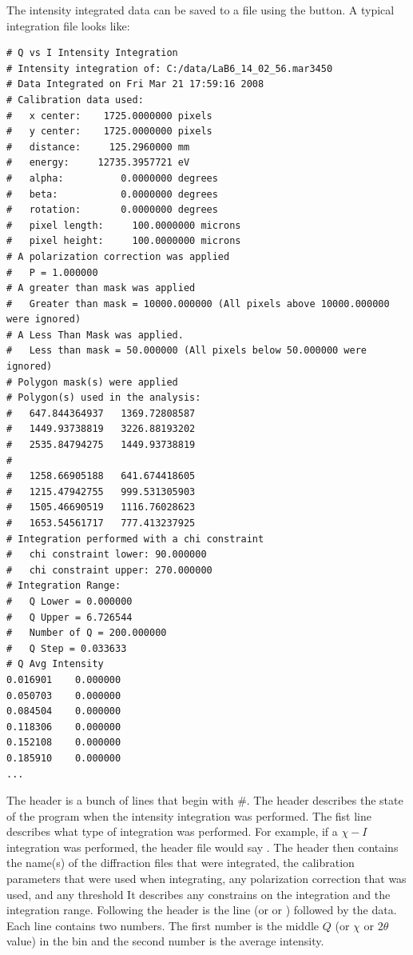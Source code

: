 The intensity integrated data can be saved to a file
using the  button. 
A typical integration file looks like:
\begin{lstlisting}
# Q vs I Intensity Integration
# Intensity integration of: C:/data/LaB6_14_02_56.mar3450 
# Data Integrated on Fri Mar 21 17:59:16 2008
# Calibration data used:
#   x center:    1725.0000000 pixels
#   y center:    1725.0000000 pixels
#   distance:     125.2960000 mm
#   energy:     12735.3957721 eV
#   alpha:          0.0000000 degrees
#   beta:           0.0000000 degrees
#   rotation:       0.0000000 degrees
#   pixel length:     100.0000000 microns
#   pixel height:     100.0000000 microns
# A polarization correction was applied
#   P = 1.000000
# A greater than mask was applied
#   Greater than mask = 10000.000000 (All pixels above 10000.000000 were ignored)
# A Less Than Mask was applied.
#   Less than mask = 50.000000 (All pixels below 50.000000 were ignored)
# Polygon mask(s) were applied
# Polygon(s) used in the analysis:
#   647.844364937	1369.72808587
#   1449.93738819	3226.88193202
#   2535.84794275	1449.93738819
#
#   1258.66905188	641.674418605
#   1215.47942755	999.531305903
#   1505.46690519	1116.76028623
#   1653.54561717	777.413237925
# Integration performed with a chi constraint
#   chi constraint lower: 90.000000
#   chi constraint upper: 270.000000
# Integration Range:
#   Q Lower = 0.000000
#   Q Upper = 6.726544
#   Number of Q = 200.000000
#   Q Step = 0.033633
# Q	Avg Intensity
0.016901	0.000000
0.050703	0.000000
0.084504	0.000000
0.118306	0.000000
0.152108	0.000000
0.185910	0.000000
...
\end{lstlisting}
The header is a bunch of lines that begin with \#.
The header describes the state of the program 
when the intensity integration was performed.
The fist line describes what type of integration was
performed. For example, if a $\chi-I$ integration was 
performed, the header file would say
.
The header then contains the name(s) of the diffraction
files that were integrated, the
calibration parameters that were used when integrating,
any polarization correction that was used, and any threshold 
It describes any constrains 
on the integration and the integration range.  Following the header 
is the line
 (or 
or ) followed by 
the data. Each line contains two numbers.
The first number is the middle $Q$ (or $\chi$ or $2\theta$ value) 
in the bin and the second number is the average intensity.
